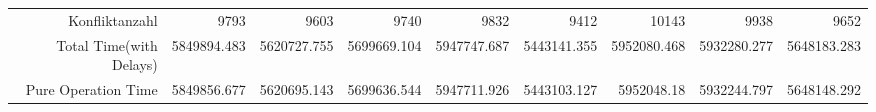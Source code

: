 \begin{landscape}
\begin{table}[htbp]
\begin{tabular}{rrrrrrrrr}
    Konfliktanzahl & 9793  & 9603  & 9740  & 9832  & 9412  & 10143 & 9938  & 9652 \\
    Total Time(with Delays) & 5849894.483 & 5620727.755 & 5699669.104 & 5947747.687 & 5443141.355 & 5952080.468 & 5932280.277 & 5648183.283 \\
    Pure Operation Time & 5849856.677 & 5620695.143 & 5699636.544 & 5947711.926 & 5443103.127 & 5952048.18 & 5932244.797 & 5648148.292 \\
    \bottomrule
    \end{tabular}%
  \label{tab:addlabel}%
\end{table}%

\end{landscape}



